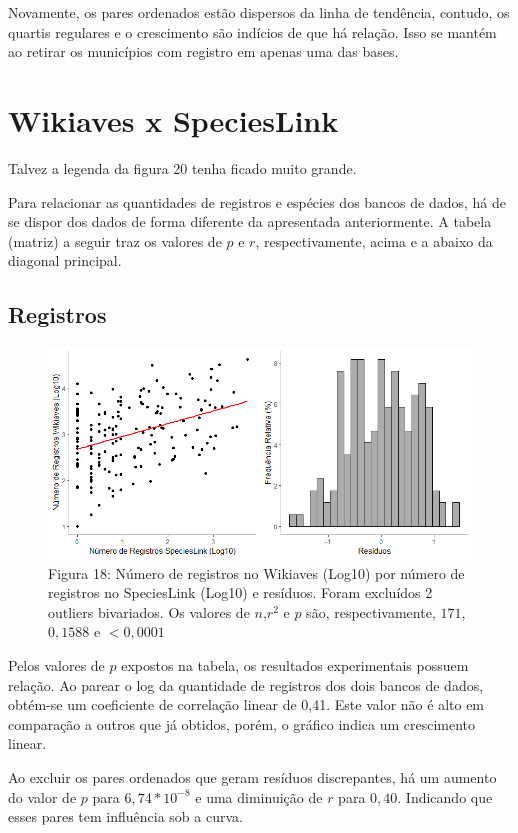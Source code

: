 \documentclass[12pt]{extarticle}
\newenvironment{resposta}{ \color{mygray}}{}
\begin{document}
 \begin{resposta}
Novamente, os pares ordenados estão dispersos da linha de tendência, contudo, os quartis regulares e o crescimento são indícios de que há relação. Isso se mantém ao retirar os municípios com registro em apenas uma das bases.
\end{resposta}

\section{Wikiaves x SpeciesLink}

\hrulefill

Talvez a legenda da figura 20 tenha ficado muito grande.

\hrulefill


\begin{resposta}
Para relacionar as quantidades de registros e espécies dos bancos de dados, há de se dispor dos dados de forma diferente da apresentada anteriormente. A tabela (matriz) a seguir traz os valores de $p$ e $r$, respectivamente, acima e a abaixo da diagonal principal.
\end{resposta}

\newpage

\subsection{Registros}

\begin{figure}[h!]
\centering
\includegraphics[width = 12cm]{Imagens/G11.png}
\\{\scriptsize  Figura 18: Número de registros no Wikiaves (Log10) por número de registros no SpeciesLink (Log10) e resíduos. Foram excluídos 2 outliers bivariados. Os valores de $n$,$r^2$ e $p$ são, respectivamente, $171$, $0,1588$ e $<0,0001$}
\end{figure}

\begin{resposta}
Pelos valores de $p$ expostos na tabela, os resultados experimentais possuem relação. Ao parear o log da quantidade de registros dos dois bancos de dados, obtém-se um coeficiente de correlação linear de 0,41. Este valor não é alto em comparação a outros que já obtidos, porém, o gráfico indica um crescimento linear.

Ao excluir os pares ordenados que geram resíduos discrepantes, há um aumento do valor de $p$ para $6,74*10^{-8}$ e uma diminuição de $r$ para $0,40$. Indicando que esses pares tem influência sob a curva.
\end{resposta}
\end{document}
